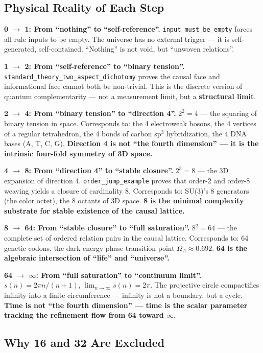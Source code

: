 \documentclass[aps,prd,twocolumn,nofootinbib,floatfix]{revtex4-2}
\begin{document}
\subsection{Physical Reality of Each Step}

\textbf{0 $\to$ 1: From ``nothing'' to ``self-reference''.} \texttt{input\_must\_be\_empty} forces all rule inputs to be empty. The universe has no external trigger --- it is self-generated, self-contained. ``Nothing'' is not void, but ``unwoven relations''.

\textbf{1 $\to$ 2: From ``self-reference'' to ``binary tension''.} \texttt{standard\_theory\_two\_aspect\_dichotomy} proves the causal face and informational face cannot both be non-trivial. This is the discrete version of quantum complementarity --- not a measurement limit, but a \textbf{structural limit}.

\textbf{2 $\to$ 4: From ``binary tension'' to ``direction 4''.} $2^2 = 4$ --- the squaring of binary tension in space. Corresponds to: the 4 electroweak bosons, the 4 vertices of a regular tetrahedron, the 4 bonds of carbon sp$^3$ hybridization, the 4 DNA bases (A, T, C, G). \textbf{Direction 4 is not ``the fourth dimension'' --- it is the intrinsic four-fold symmetry of 3D space.}

\textbf{4 $\to$ 8: From ``direction 4'' to ``stable closure''.} $2^3 = 8$ --- the 3D expansion of direction 4. \texttt{order\_jump\_example} proves that order-2 and order-8 weaving yields a closure of cardinality 8. Corresponds to: SU(3)'s 8 generators (the color octet), the 8 octants of 3D space. \textbf{8 is the minimal complexity substrate for stable existence of the causal lattice.}

\textbf{8 $\to$ 64: From ``stable closure'' to ``full saturation''.} $8^2 = 64$ --- the complete set of ordered relation pairs in the causal lattice. Corresponds to: 64 genetic codons, the dark-energy phase-transition point $\Omega_\Lambda \approx 0.692$. \textbf{64 is the algebraic intersection of ``life'' and ``universe''.}

\textbf{64 $\to$ $\infty$: From ``full saturation'' to ``continuum limit''.} $s(n) = 2\pi n/(n+1)$, $\lim_{n\to\infty} s(n) = 2\pi$. The projective circle compactifies infinity into a finite circumference --- infinity is not a boundary, but a cycle. \textbf{Time is not ``the fourth dimension'' --- time is the scalar parameter tracking the refinement flow from 64 toward $\infty$.}

\subsection{Why 16 and 32 Are Excluded}
\end{document}
